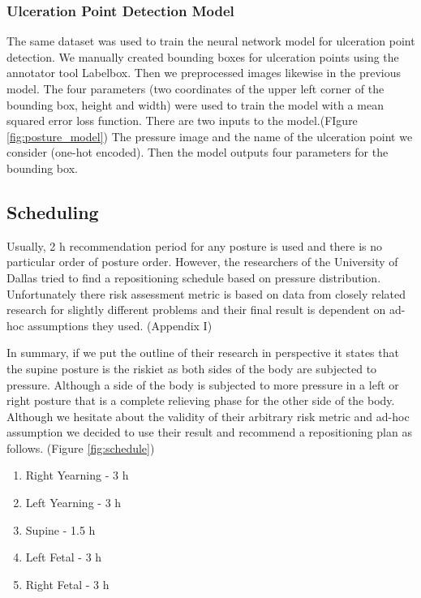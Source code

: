 \subsubsection{Ulceration Point Detection Model}

The same dataset was used to train the neural network model for ulceration point detection. We manually created bounding boxes for ulceration points using the annotator tool Labelbox\textsuperscript{\textregistered}. Then we preprocessed images likewise in the previous model.  The four parameters (two coordinates of the upper left corner of the bounding box, height and width) were used to train the model with a mean squared error loss function. There are two inputs to the model.(FIgure \ref{fig:posture_model}) The pressure image and the name of the ulceration point we consider (one-hot encoded). Then the model outputs four parameters for the bounding box. 


\subsection{Scheduling}

Usually, 2 h recommendation period for any posture is used and there is no particular order of posture order. However, the researchers of the University of Dallas tried to find a repositioning schedule based on pressure distribution. Unfortunately there risk assessment metric is based on data from closely related research for slightly different problems and their final result is dependent on ad-hoc assumptions they used. (Appendix I)

In summary, if we put the outline of their research in perspective it states that the supine posture is the riskiet as both sides of the body are subjected to pressure. Although a side of the body is subjected to more pressure in a left or right posture that is a complete relieving phase for the other side of the body. Although we hesitate about the validity of their arbitrary risk metric and ad-hoc assumption we decided to use their result and recommend a repositioning plan as follows.  (Figure \ref{fig:schedule})

\begin{enumerate}
	\item Right Yearning - 3 h
	\item Left Yearning - 3 h
	\item Supine - 1.5 h
	\item Left Fetal - 3 h
	\item Right Fetal - 3 h
\end{enumerate}

